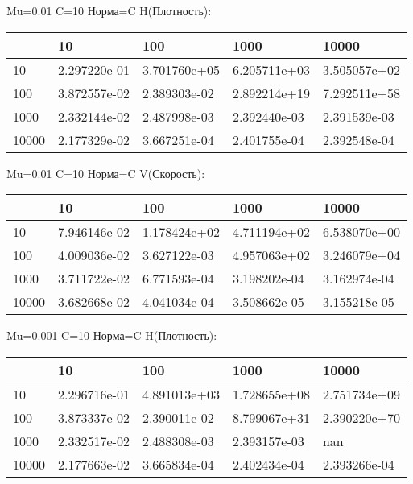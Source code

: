 \documentclass[a4paper, 12pt]{article}
\begin{document}
\bigskip
\bigskip
\bigskip


Mu=0.01  C=10 Норма=C H(Плотность):


\begin{tabular}{lllll}
\toprule
{} &         10    &         100   &         1000  &         10000 \\
\midrule
10    &  2.297220e-01 &  3.701760e+05 &  6.205711e+03 &  3.505057e+02 \\
100   &  3.872557e-02 &  2.389303e-02 &  2.892214e+19 &  7.292511e+58 \\
1000  &  2.332144e-02 &  2.487998e-03 &  2.392440e-03 &  2.391539e-03 \\
10000 &  2.177329e-02 &  3.667251e-04 &  2.401755e-04 &  2.392548e-04 \\
\bottomrule
\end{tabular}



\bigskip
\bigskip
\bigskip


Mu=0.01  C=10 Норма=C V(Скорость):


\begin{tabular}{lllll}
\toprule
{} &         10    &         100   &         1000  &         10000 \\
\midrule
10    &  7.946146e-02 &  1.178424e+02 &  4.711194e+02 &  6.538070e+00 \\
100   &  4.009036e-02 &  3.627122e-03 &  4.957063e+02 &  3.246079e+04 \\
1000  &  3.711722e-02 &  6.771593e-04 &  3.198202e-04 &  3.162974e-04 \\
10000 &  3.682668e-02 &  4.041034e-04 &  3.508662e-05 &  3.155218e-05 \\
\bottomrule
\end{tabular}



\bigskip
\bigskip
\bigskip


Mu=0.001  C=10 Норма=C H(Плотность):


\begin{tabular}{lllll}
\toprule
{} &         10    &         100   &         1000  &         10000 \\
\midrule
10    &  2.296716e-01 &  4.891013e+03 &  1.728655e+08 &  2.751734e+09 \\
100   &  3.873337e-02 &  2.390011e-02 &  8.799067e+31 &  2.390220e+70 \\
1000  &  2.332517e-02 &  2.488308e-03 &  2.393157e-03 &           nan \\
10000 &  2.177663e-02 &  3.665834e-04 &  2.402434e-04 &  2.393266e-04 \\
\bottomrule
\end{tabular}
\end{document}
